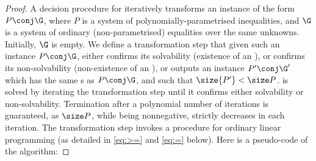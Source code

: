 \begin{proof}
A decision procedure for \allpolyineqsolvname iteratively transforms an instance
of the form $P \conj \G$, where $P$ is a system
of polynomially-parametrised inequalities, and $\G$ is a system of ordinary (non-parametrised)
equalities over the same unknowns.
Initially, $\G$ is empty.
We define a transformation step that given such an instance $P \conj\G$, 
either confirms its solvability (existence of an \aasol), 
or confirms its non-solvability (non-existence of an \aasol), or outputs an instance $P' \conj \G'$ 
which has the same {\aasol}s as $P\conj \G$, and 
such that $\size {P'} < \size P$.
\allpolyineqsolvname is solved by iterating the transformation step until it confirms
either solvability or non-solvability.
Termination after a polynomial number of iterations is guaranteed, as
$\size P$, while being nonnegative, strictly decreases in each iteration.
The transformation step invokes a \PTIME procedure 
for 
ordinary linear programming
(as detailed in \eqref{eq:>=} and \eqref{eq:=} below).
Here is a pseudo-code of the algorithm:


\end{proof}
